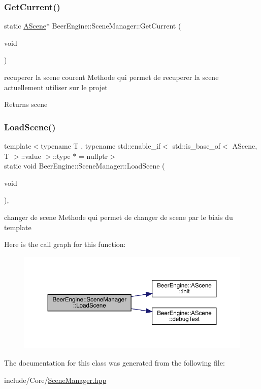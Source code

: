 \subsubsection{\texorpdfstring{Get\+Current()}{GetCurrent()}}
{\footnotesize\ttfamily static \mbox{\hyperlink{class_beer_engine_1_1_a_scene}{A\+Scene}}$\ast$ Beer\+Engine\+::\+Scene\+Manager\+::\+Get\+Current (\begin{DoxyParamCaption}\item[{void}]{ }\end{DoxyParamCaption})\hspace{0.3cm}{\ttfamily [static]}}



recuperer la scene courent Methode qui permet de recuperer la scene actuellement utiliser sur le projet 

\begin{DoxyReturn}{Returns}
scene 
\end{DoxyReturn}
\mbox{\label{class_beer_engine_1_1_scene_manager_a9414ed3c9d4a170e198afe83d15db360}} 
\subsubsection{\texorpdfstring{Load\+Scene()}{LoadScene()}}
{\footnotesize\ttfamily template$<$typename T , typename std\+::enable\+\_\+if$<$ std\+::is\+\_\+base\+\_\+of$<$ A\+Scene, T $>$\+::value $>$\+::type $\ast$  = nullptr$>$ \\
static void Beer\+Engine\+::\+Scene\+Manager\+::\+Load\+Scene (\begin{DoxyParamCaption}\item[{void}]{ }\end{DoxyParamCaption})\hspace{0.3cm}{\ttfamily [inline]}, {\ttfamily [static]}}



changer de scene Methode qui permet de changer de scene par le biais du template 

Here is the call graph for this function\+:
\nopagebreak
\begin{figure}[H]
\begin{center}
\leavevmode
\includegraphics[width=350pt]{class_beer_engine_1_1_scene_manager_a9414ed3c9d4a170e198afe83d15db360_cgraph}
\end{center}
\end{figure}


The documentation for this class was generated from the following file\+:\begin{DoxyCompactItemize}
\item 
include/\+Core/\mbox{\hyperlink{_scene_manager_8hpp}{Scene\+Manager.\+hpp}}\end{DoxyCompactItemize}
